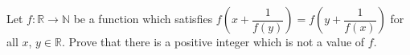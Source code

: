 Let $ f: \mathbb{R}\to\mathbb{N}$ be a function which satisfies $ f\left(x + \dfrac{1}{f(y)}\right) = f\left(y + \dfrac{1}{f(x)}\right)$ for all $ x$,  $ y\in\mathbb{R}$. Prove that there is a positive integer which is not a value of $ f$.
